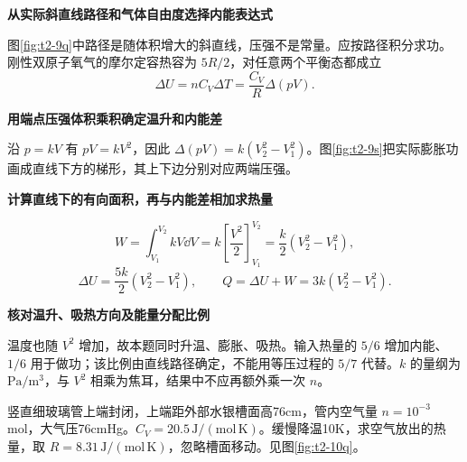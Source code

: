 \begin{solution}\textbf{从实际斜直线路径和气体自由度选择内能表达式}\par\nobreak
图\ref{fig:t2-9q}中路径是随体积增大的斜直线，压强不是常量。应按路径积分求功。刚性双原子氧气的摩尔定容热容为 $5R/2$，对任意两个平衡态都成立
\[\Delta U=nC_V\Delta T=\frac{C_V}{R}\Delta(pV).\]


\par\medskip{}\noindent\textbf{用端点压强体积乘积确定温升和内能差}\par\nobreak
沿 $p=kV$ 有 $pV=kV^2$，因此 $\Delta(pV)=k(V_2^2-V_1^2)$。图\ref{fig:t2-9s}把实际膨胀功画成直线下方的梯形，其上下边分别对应两端压强。



\par\medskip{}\noindent\textbf{计算直线下的有向面积，再与内能差相加求热量}\par\nobreak
\[\boxed{W=\int_{V_1}^{V_2}kV\dd V
=k\left[\frac{V^2}{2}\right]_{V_1}^{V_2}
=\frac k2(V_2^2-V_1^2)},\]
\[\boxed{\Delta U=\frac{5k}{2}(V_2^2-V_1^2),\qquad Q=\Delta U+W=3k(V_2^2-V_1^2)}.\]


\par\medskip{}\noindent\textbf{核对温升、吸热方向及能量分配比例}\par\nobreak
温度也随 $V^2$ 增加，故本题同时升温、膨胀、吸热。输入热量的 $5/6$ 增加内能、$1/6$ 用于做功；该比例由直线路径确定，不能用等压过程的 $5/7$ 代替。$k$ 的量纲为 $\mathrm{Pa/m^3}$，与 $V^2$ 相乘为焦耳，结果中不应再额外乘一次 $n$。
\end{solution}
\par\medskip\noindent\begin{minipage}{\textwidth}
\begin{example}[短管中空气的非等压冷却]\label{t2-10}
竖直细玻璃管上端封闭，上端距外部水银槽面高76cm，管内空气量 $n=10^{-3}$mol，大气压76cmHg。$C_V=20.5\,\mathrm{J/(mol\,K)}$。缓慢降温10K，求空气放出的热量，取 $R=8.31\,\mathrm{J/(mol\,K)}$，忽略槽面移动。见图\ref{fig:t2-10q}。
\end{example}
\end{minipage}
